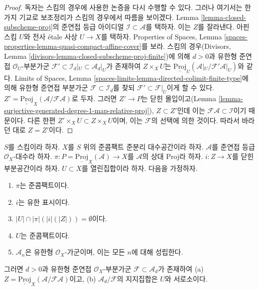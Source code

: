 \begin{proof}
독자는 스킴의 경우에 사용한 논증을 다시 수행할 수 있다. 그러나 여기서는
한 가지 기교로 보조정리가 스킴의 경우에서 따름을 보이겠다. Lemma
\ref{lemma-closed-subscheme-proj}의 준연접 등급 아이디얼
$\mathcal{I} \subset \mathcal{A}$를 택하자. 이는 $Z$를 잘라낸다.
아핀 스킴 $U$와 전사
\'etale 사상 $U \to X$를 택하자. Properties of Spaces, Lemma
\ref{spaces-properties-lemma-quasi-compact-affine-cover}를 보라.
스킴의 경우(Divisors, Lemma
\ref{divisors-lemma-closed-subscheme-proj-finite})에 의해
$d > 0$과 유한형 준연접 $\mathcal{O}_U$-부분가군
$\mathcal{F}' \subset \mathcal{I}_d|_U \subset \mathcal{A}_d|_U$가
존재하여 $Z \times_X U$는
$\underline{\text{Proj}}_U(\mathcal{A}|_U/\mathcal{F}'\mathcal{A}|_U)$와
같다. Limits of Spaces, Lemma
\ref{spaces-limits-lemma-directed-colimit-finite-type}에 의해
유한형 준연접 부분가군 $\mathcal{F} \subset \mathcal{I}_d$를 찾되
$\mathcal{F}' \subset \mathcal{F}|_U$이게 할 수 있다.
$Z' = \underline{\text{Proj}}_X(\mathcal{A}/\mathcal{F}\mathcal{A})$로
두자. 그러면
$Z' \to P$는 닫힌 몰입이고(Lemma
\ref{lemma-surjective-generated-degree-1-map-relative-proj}),
$Z \subset Z'$인데 이는 $\mathcal{F}\mathcal{A} \subset \mathcal{I}$이기
때문이다. 다른 한편 $Z' \times_X U \subset Z \times_X U$이며, 이는
$\mathcal{F}$의 선택에 의한 것이다. 따라서 바라던 대로
$Z = Z'$이다.
\end{proof}

\begin{lemma}
\label{lemma-closed-subscheme-proj-finite-type}
$S$를 스킴이라 하자. $X$를 $S$ 위의 준콤팩트 준분리 대수공간이라
하자. $\mathcal{A}$를 준연접 등급 $\mathcal{O}_X$-대수라 하자.
$\pi : P = \underline{\text{Proj}}_X(\mathcal{A}) \to X$를
$\mathcal{A}$의 상대 Proj라 하자.
$i : Z \to X$를 닫힌 부분공간이라 하자. $U \subset X$를 열린집합이라
하자. 다음을 가정하자.
\begin{enumerate}
\item $\pi$는 준콤팩트이다.
\item $i$는 유한 표시이다.
\item $|U| \cap |\pi|(|i|(|Z|)) = \emptyset$이다.
\item $U$는 준콤팩트이다.
\item $\mathcal{A}_n$은 유한형 $\mathcal{O}_X$-가군이며, 이는 모든
$n$에 대해 성립한다.
\end{enumerate}
그러면 $d > 0$과 유한형 준연접 $\mathcal{O}_X$-부분가군
$\mathcal{F} \subset \mathcal{A}_d$가 존재하여 (a)
$Z = \underline{\text{Proj}}_X(\mathcal{A}/\mathcal{F}\mathcal{A})$이고,
(b) $\mathcal{A}_d/\mathcal{F}$의 지지집합은 $U$와 서로소이다.
\end{lemma}


